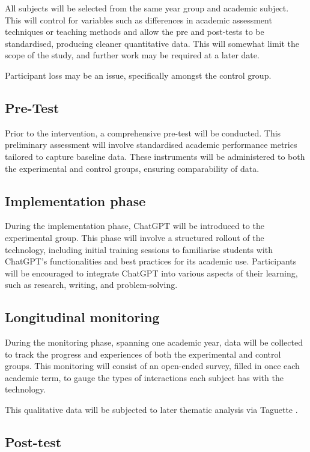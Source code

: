 \documentclass[12pt]{article}
\begin{document}
All subjects will be selected from the same year group and academic subject. This will control for variables such as differences in academic assessment techniques or teaching methods and allow the pre and post-tests to be standardised, producing cleaner quantitative data. This will somewhat limit the scope of the study, and further work may be required at a later date.

Participant loss may be an issue, specifically amongst the control group.

\subsection{Pre-Test}

Prior to the intervention, a comprehensive pre-test will be conducted. This preliminary assessment will involve standardised academic performance metrics tailored to capture baseline data. These instruments will be administered to both the experimental and control groups, ensuring comparability of data.

\subsection{Implementation phase}

During the implementation phase, ChatGPT will be introduced to the experimental group. This phase will involve a structured rollout of the technology, including initial training sessions to familiarise students with ChatGPT's functionalities and best practices for its academic use. Participants will be encouraged to integrate ChatGPT into various aspects of their learning, such as research, writing, and problem-solving. 

\subsection{Longitudinal monitoring }

During the monitoring phase, spanning one academic year, data will be collected to track the progress and experiences of both the experimental and control groups. This monitoring will consist of an open-ended survey, filled in once each academic term, to gauge the types of interactions each subject has with the technology.

This qualitative data will be subjected to later thematic analysis via Taguette \cite{taguette}.

\subsection{Post-test}
\end{document}
